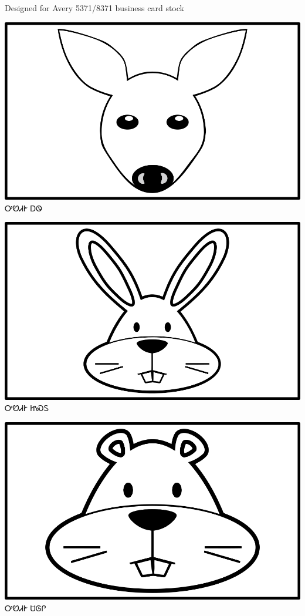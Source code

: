 \documentclass[avery5371]{flashcards}%
\begin{document}
    Designed for Avery 5371/8371 business card stock

    \begin{flashcard}{
        \includegraphics[width=0.95\columnwidth,height=.51\columnwidth,keepaspectratio]{../artwork/objects-animate/ahwi}
    }
        \Huge ᎤᏬᏗᎨ ᎠᏫ
    \end{flashcard}

    \begin{flashcard}{
        \includegraphics[width=0.95\columnwidth,height=.51\columnwidth,keepaspectratio]{../artwork/objects-animate/jisdu}
    }
        \Huge ᎤᏬᏗᎨ ᏥᏍᏚ
    \end{flashcard}

    \begin{flashcard}{
        \includegraphics[width=0.95\columnwidth,height=.51\columnwidth,keepaspectratio]{../artwork/objects-animate/saloli}
    }
        \Huge ᎤᏬᏗᎨ ᏌᎶᎵ
    \end{flashcard}
\end{document}
